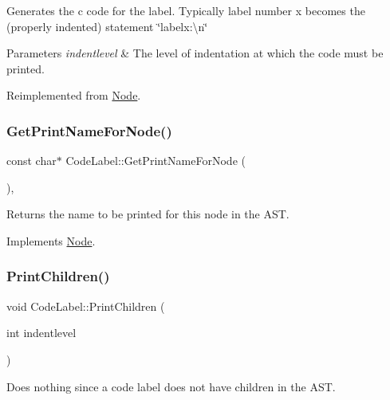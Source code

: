 Generates the c code for the label. Typically label number x becomes the (properly indented) statement \char`\"{}labelx\+:\textbackslash{}n\char`\"{} 
\begin{DoxyParams}{Parameters}
{\em indentlevel} & The level of indentation at which the code must be printed. \\
\hline
\end{DoxyParams}


Reimplemented from \hyperlink{class_node_acb60e526730e8436056375a3055c2c32}{Node}.

\mbox{\label{class_code_label_a8facbf3c0c9e138c5e20c82638b5f78b}} 
\subsubsection{\texorpdfstring{Get\+Print\+Name\+For\+Node()}{GetPrintNameForNode()}}
{\footnotesize\ttfamily const char$\ast$ Code\+Label\+::\+Get\+Print\+Name\+For\+Node (\begin{DoxyParamCaption}{ }\end{DoxyParamCaption})\hspace{0.3cm}{\ttfamily [inline]}, {\ttfamily [virtual]}}

Returns the name to be printed for this node in the A\+ST. 

Implements \hyperlink{class_node_a56e29657306ffb004d69c6929ae44269}{Node}.

\mbox{\label{class_code_label_a982af1b687ea06a189a87f49a50fdf93}} 
\subsubsection{\texorpdfstring{Print\+Children()}{PrintChildren()}}
{\footnotesize\ttfamily void Code\+Label\+::\+Print\+Children (\begin{DoxyParamCaption}\item[{int}]{indentlevel }\end{DoxyParamCaption})\hspace{0.3cm}{\ttfamily [virtual]}}

Does nothing since a code label does not have children in the A\+ST. 


